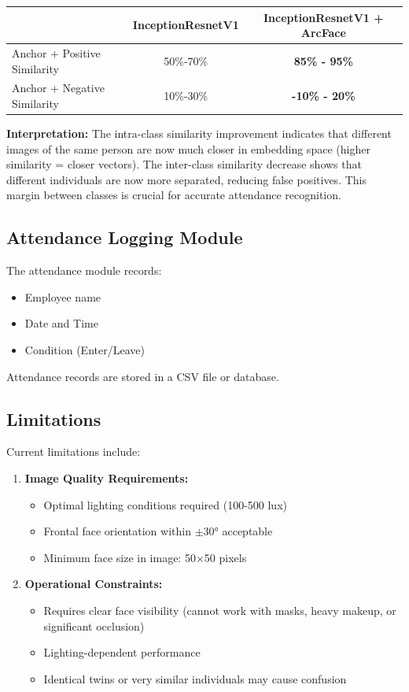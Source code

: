 \documentclass[sommairechap,stylejchiquet]{these_gi}
\begin{document}
\begin{center}
\begin{tabular}{|l|c|c|}
\hline
& \textbf{InceptionResnetV1} & \textbf{InceptionResnetV1 + ArcFace} \\
\hline
Anchor + Positive Similarity & 50\%-70\% & \textbf{85\% - 95\%} \\
\hline
Anchor + Negative Similarity & 10\%-30\% & \textbf{-10\% - 20\%} \\
\hline
\end{tabular}
\end{center}

\textbf{Interpretation:}
The intra-class similarity improvement indicates that different images of the same person are now much closer in embedding space (higher similarity = closer vectors). The inter-class similarity decrease shows that different individuals are now more separated, reducing false positives. This margin between classes is crucial for accurate attendance recognition.

\subsection{Attendance Logging Module}

The attendance module records:
\begin{itemize}
    \item Employee name
    \item Date and Time
    \item Condition (Enter/Leave)
\end{itemize}

Attendance records are stored in a CSV file or database.

\subsection{Limitations}
Current limitations include:
\begin{enumerate}
    \item \textbf{Image Quality Requirements:}
    \begin{itemize}
        \item Optimal lighting conditions required (100-500 lux)
        \item Frontal face orientation within $\pm 30°$ acceptable
        \item Minimum face size in image: 50$\times$50 pixels
    \end{itemize}
    \item \textbf{Operational Constraints:}
    \begin{itemize}
        \item Requires clear face visibility (cannot work with masks, heavy makeup, or significant occlusion)
        \item Lighting-dependent performance
        \item Identical twins or very similar individuals may cause confusion
    \end{itemize}
\end{enumerate}
\end{document}
